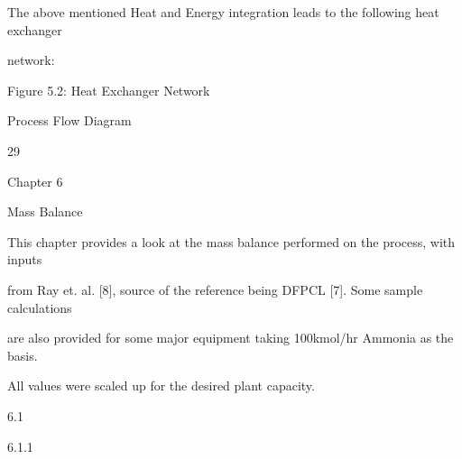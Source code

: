 \documentclass[a4paper,portrait,12pt]{article}
\begin{document}
\begin{flushleft}
The above mentioned Heat and Energy integration leads to the following heat exchanger
\end{flushleft}


\begin{flushleft}
network:
\end{flushleft}





\begin{flushleft}
\newpage
Figure 5.2: Heat Exchanger Network
\end{flushleft}





\begin{flushleft}
Process Flow Diagram
\end{flushleft}


29





\begin{flushleft}
\newpage
Chapter 6
\end{flushleft}





\begin{flushleft}
Mass Balance
\end{flushleft}


\begin{flushleft}
This chapter provides a look at the mass balance performed on the process, with inputs
\end{flushleft}


\begin{flushleft}
from Ray et. al. [8], source of the reference being DFPCL [7]. Some sample calculations
\end{flushleft}


\begin{flushleft}
are also provided for some major equipment taking 100kmol/hr Ammonia as the basis.
\end{flushleft}


\begin{flushleft}
All values were scaled up for the desired plant capacity.
\end{flushleft}





6.1


6.1.1
\end{document}
